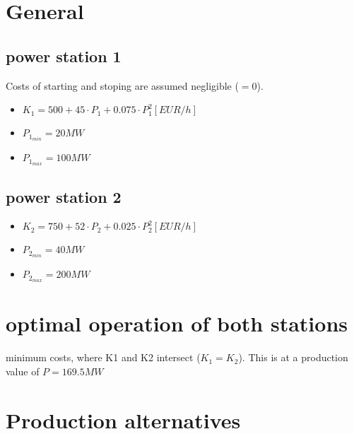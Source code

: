 \documentclass{article}
\begin{document}
	\section*{General}
		\subsection*{power station 1}
			Costs of starting and stoping are assumed negligible ($=0$).
			\begin{itemize}
				\item $K_1=500+45\cdot P_1+0.075\cdot P_1^2 [EUR/h]$
				\item $P_{1_{min}}=20MW$
				\item $P_{1_{max}}=100MW$
			\end{itemize}
		\subsection*{power station 2}
			\begin{itemize}
				\item $K_2=750+52\cdot P_2+0.025\cdot P_2^2 [EUR/h]$
				\item $P_{2_{min}}=40MW$
				\item $P_{2_{max}}=200MW$
			\end{itemize}
	\section{optimal operation of both stations}
		minimum costs, where K1 and K2 intersect ($K_1=K_2$). This is at a production value of $P=169.5MW$
	\section{Production alternatives}
\end{document}
